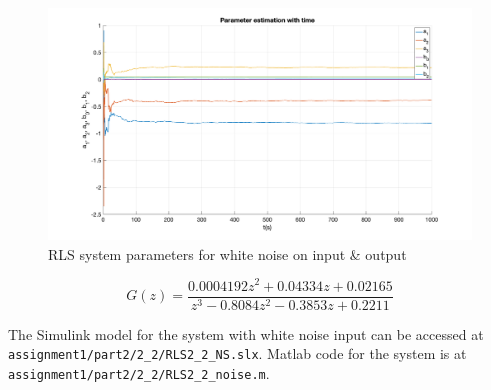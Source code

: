 \begin{figure}
	\centering
	\includegraphics[totalheight=8cm]{images/RLSIWNOWhiteNoiseParams.png}
	\caption{RLS system parameters for white noise on input \& output}
	\label{fig:RLSIWNOWhiteNoiseParams}
\end{figure}

\begin{equation}
	G(z) =	\frac{ 0.0004192 z^2 + 0.04334 z + 0.02165}{z^3 - 0.8084 z^2 - 0.3853 z + 0.2211}
	\label{eq:RLSIWNOWhiteNoiseTransferFunction}
\end{equation}

The Simulink model for the system with white noise input can be accessed at \hspace{-1ex}\lstinline| assignment1/part2/2_2/RLS2_2_NS.slx|.
Matlab code for the system is at \hspace{-1ex}\lstinline| assignment1/part2/2_2/RLS2_2_noise.m|.